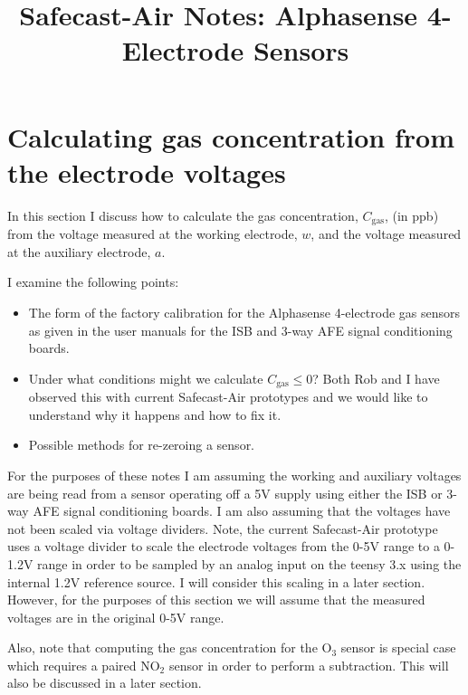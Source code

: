 \documentclass[letterpaper]{article}
\newcommand{\cgas}{C_{\mathrm{gas}}}
\newcommand{\wrk}{w}
\newcommand{\aux}{a}
\begin{document}
\title{Safecast-Air Notes: Alphasense 4-Electrode Sensors}

\date{}
\maketitle

\section{Calculating gas concentration from the electrode voltages}

In this section I discuss how to calculate the gas concentration, $\cgas$, (in
ppb) from the voltage measured at the working electrode, $\wrk$, and the
voltage measured at the auxiliary electrode, $\aux$.   

I examine the following points:

\begin{itemize}

    \item The form of the factory calibration for the Alphasense 4-electrode
        gas sensors as given in the user manuals for the ISB and 3-way AFE
        signal conditioning boards. 

    \item Under what conditions might we calculate $\cgas \leq 0$? Both Rob and
        I have observed this with current Safecast-Air prototypes and we would like
        to understand why it happens and how to fix it.

    \item Possible methods for re-zeroing a sensor.  

\end{itemize}


For the purposes of these notes I am assuming the working and auxiliary
voltages are being read from a sensor operating off a 5V supply using either
the ISB or 3-way AFE signal conditioning boards. I am also assuming that
the voltages have not been scaled via voltage dividers. Note, the current
Safecast-Air prototype uses a voltage divider to scale the electrode voltages
from the 0-5V range to a 0-1.2V range in order to be sampled by an analog input
on the teensy 3.x using the internal 1.2V reference source. I will consider this
scaling in a later section.  However, for the purposes of this section we will
assume that the measured voltages are in the original 0-5V range. 

Also, note that computing the gas concentration for the $\mathrm{O_3}$ sensor
is special case which requires a paired $\mathrm{NO_2}$ sensor in order to
perform a subtraction. This will also be discussed in a later section.
\end{document}
